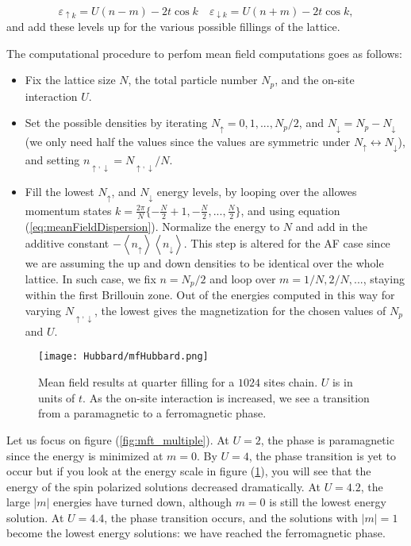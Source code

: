 \begin{equation}\label{eq:meanFieldDispersion}
\varepsilon_{\uparrow k} = U ( n - m ) - 2 t \cos k \quad \varepsilon_{\downarrow k} = U ( n + m ) - 2 t \cos k ,
\end{equation}
and add these levels up for the various possible fillings of the lattice.

The computational procedure to perfom mean field computations goes as follows:
\begin{itemize}
\item Fix the lattice size $N$, the total particle number $N_p$, and the on-site interaction $U$.
\item Set the possible densities by iterating $N_\uparrow = 0, 1, ..., N_p / 2$, and $N_\downarrow = N_p - N_\downarrow$ (we only need half the values since the values are symmetric under $ N_\uparrow \leftrightarrow N_\downarrow$), and setting $n_{\uparrow, \downarrow} = N_{\uparrow, \downarrow} / N$.
\item Fill the lowest $N_\uparrow$, and $N_\downarrow$ energy levels, by looping over the allowes momentum states $k = \frac{2\pi}{N} \{ -\frac{N}{2} + 1, -\frac{N}{2}, ..., \frac{N}{2} \}$, and using equation (\ref{eq:meanFieldDispersion}).
Normalize the energy to $N$ and add in the additive constant $- \left\langle n_\uparrow \right\rangle \left\langle n_\downarrow \right\rangle$.
This step is altered for the \acs{AF} case since we are assuming the up and down densities to be identical over the whole lattice.
In such case, we fix $n = N_p / 2$ and loop over $m = 1/ N, 2 / N,...$, staying within the first Brillouin zone.
Out of the energies computed in this way for varying $N_{\uparrow, \downarrow}$, the lowest gives the magnetization for the chosen values of $N_p$ and $U$.
\end{itemize}

\begin{figure}[H]
	\centering
\hspace{12mm}\texttt{[image: Hubbard/mfHubbard.png]}
	\caption[Mean field results for the \acs{1D} Hubbard model.]{Mean field results at quarter filling for a $ 1024$ sites chain.
	$U$ is in units of $t$.
	As the on-site interaction is increased, we see a transition from a paramagnetic to a ferromagnetic phase.}
	\label{fig:mft}
\end{figure}

Let us focus on figure (\ref{fig:mft_multiple}).
At $U = 2$, the phase is paramagnetic since the energy is minimized at $m = 0$. By $U = 4$, the phase transition is yet to occur but if you look at the energy scale in figure (\ref{fig:mft}), you will see that the energy of the spin polarized solutions decreased dramatically.
	At $U = 4.2$, the large $| m | $ energies have turned down, although $m = 0$ is still the lowest energy solution.
	At $U = 4.4$, the phase transition occurs, and the solutions with $| m | = 1$ become the lowest energy solutions: we have reached the ferromagnetic phase.

